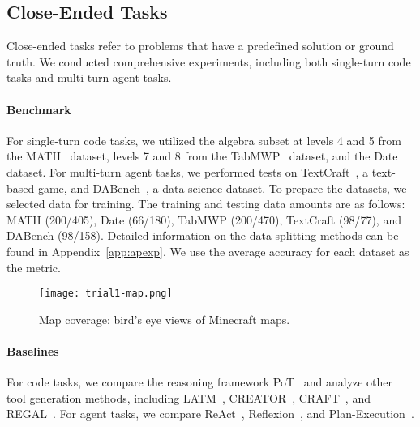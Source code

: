 \subsection{Close-Ended Tasks}
Close-ended tasks refer to problems that have a predefined solution or ground truth. We conducted comprehensive experiments, including both single-turn code tasks and multi-turn agent tasks.
\vspace{-5pt}
\paragraph{Benchmark}
For single-turn code tasks, we utilized the algebra subset at levels 4 and 5 from the MATH~\citep{hendrycks2021measuring} dataset, levels 7 and 8 from the TabMWP~\citep{grand2023learning} dataset, and the Date~\citep{srivastava2022beyond} dataset. For multi-turn agent tasks, we performed tests on TextCraft~\citep{cote2019textworld}, a text-based game, and DABench~\citep{hu2024infiagent}, a data science dataset. To prepare the datasets, we selected data for training. The training and testing data amounts are as follows: MATH (200/405), Date (66/180), TabMWP (200/470), TextCraft (98/77), and DABench (98/158). Detailed information on the data splitting methods can be found in Appendix~\ref{app:apexp}. We use the average accuracy for each dataset as the metric. 

\begin{figure}[H]
\vskip -0.05in
\begin{center}
\centerline{\texttt{[image: trial1-map.png]}}
\vskip -0.05in
\caption{Map coverage: bird’s eye views of Minecraft maps.}
\label{fig:trial1-map}
\end{center}
\vskip -0.35in
\end{figure}
\vspace{-5pt}
\paragraph{Baselines}
For code tasks, we compare the reasoning framework PoT~\citep{chen2022program} and analyze other tool generation methods, including LATM~\citep{cai2023large}, CREATOR~\citep{qian2023creator}, CRAFT~\citep{yuan2023craft}, and REGAL~\citep{stengel2024regal}. For agent tasks, we compare ReAct~\citep{yao2022react}, Reflexion~\citep{shinn2023reflexion}, and Plan-Execution~\citep{shridhar2023art, yang2023intercode}.
\vspace{-5pt}
